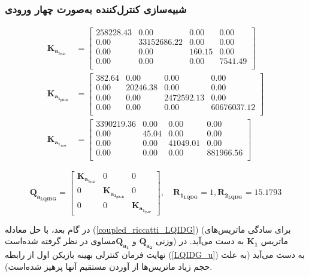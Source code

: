 \subsubsection{شبیه‌سازی کنترل‌کننده به‌صورت چهار ورودی}\label{mimo_sim}
\setcounter{MaxMatrixCols}{20}

\begin{equation}
	\begin{split}
		\boldsymbol{K_{a_{1_{roll}}}} &= \begin{bmatrix}
258228.43 & 0.00 & 0.00 & 0.00 \\ 
0.00 & 33152686.22 & 0.00 & 0.00 \\ 
0.00 & 0.00 & 160.15 & 0.00 \\ 
0.00 & 0.00 & 0.00 & 7541.49 \\ 
		\end{bmatrix}\\
	 \boldsymbol{K_{a_{1_{pitch}}}} & = \begin{bmatrix}
382.64 & 0.00 & 0.00 & 0.00 \\ 
0.00 & 20246.38 & 0.00 & 0.00 \\ 
0.00 & 0.00 & 2472592.13 & 0.00 \\ 
0.00 & 0.00 & 0.00 & 60676037.12 \\ 
\end{bmatrix}\\
		\boldsymbol{K_{a_{1_{yaw}}}} &= 
		\begin{bmatrix}
3390219.36 & 0.00 & 0.00 & 0.00 \\ 
0.00 & 45.04 & 0.00 & 0.00 \\ 
0.00 & 0.00 & 41049.01 & 0.00 \\ 
0.00 & 0.00 & 0.00 & 881966.56 \\ 
		\end{bmatrix}
	\end{split}
\end{equation}


\begin{equation}
	\boldsymbol{Q_{a_{LQIDG}}}  = 
	\begin{bmatrix}
		\boldsymbol{K_{a_{1_{roll}}}}  & 0 & 0\\
		0 & \boldsymbol{K_{a_{1_{pitch}}}} & 0\\
		0 & 0 & \boldsymbol{K_{a_{1_{yaw}}}}
	\end{bmatrix}, \quad  \boldsymbol{R_{1_{LQDG}}} = 1, \boldsymbol{R_{2_{LQDG}}} = 15.1793
\end{equation}

در گام بعد، با حل معادله
(\ref{coupled_riccatti_LQIDG})
(برای سادگی ماتریس‌های وزنی $\boldsymbol{{Q}_{a_2}}$ و $\boldsymbol{{Q}_{a_1}}$مساوی در نظر گرفته شده‌است)
ماتریس
$\boldsymbol{{K}_1}$ به دست می‌آید.
در نهایت فرمان کنترلی بهینه بازیکن اول از رابطه
(\ref{LQIDG_u})
به دست می‌آید (به علت حجم زیاد ماتریس‌ها از آوردن مستقیم آنها پرهیز شده‌است).

